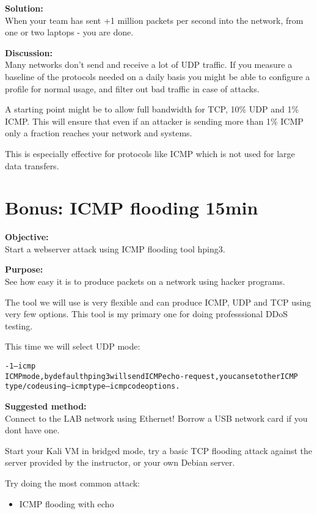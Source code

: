 \documentclass[a4paper,11pt,notitlepage]{report}
\begin{document}
{\bf Solution:}\\
When your team has sent +1 million packets per second into the network, from one or two laptops - you are done.

{\bf Discussion:}\\
Many networks don't send and receive a lot of UDP traffic. If you measure a baseline of the protocols needed on a daily basis you might be able to configure a profile for normal usage, and filter out bad traffic in case of attacks.

A starting point might be to allow full bandwidth for TCP, 10\% UDP and 1\% ICMP. This will ensure that even if an attacker is sending more than 1\% ICMP only a fraction reaches your network and systems.

This is especially effective for protocols like ICMP which is not used for large data transfers.

\chapter{Bonus: ICMP flooding 15min}

{\bf Objective:}\\
Start a webserver attack using ICMP flooding tool hping3.

{\bf Purpose:}\\
See how easy it is to produce packets on a network using hacker programs.

The tool we will use is very flexible and can produce ICMP, UDP and TCP using very few options. This tool is my primary one for doing professsional DDoS testing.

This time we will select UDP mode:

\begin{alltt}\footnotesize
-1 --icmp
       ICMP  mode,  by  default  hping3  will  send  ICMP echo-request, you can set other ICMP
       type/code using --icmptype --icmpcode options.
\end{alltt}

{\bf Suggested method:}\\
Connect to the LAB network using Ethernet! Borrow a USB network card if you dont have one.

Start your Kali VM in bridged mode, try a basic TCP flooding attack against the server provided by the instructor, or your own Debian server.

Try doing the most common attack:
\begin{itemize}
\item ICMP flooding with echo
\end{itemize}
\end{document}

